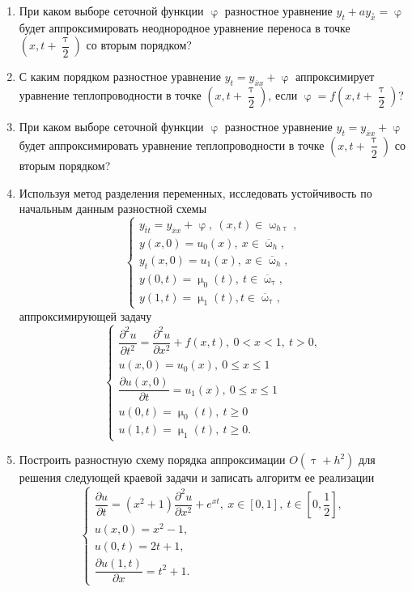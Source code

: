 \documentclass[a4paper, 12pt]{report}
\numberwithin{equation}{section}
\newcommand{\ol}{\overline}
\renewcommand{\leq}{\leqslant}
\renewcommand{\geq}{\geqslant}
\renewcommand{\varphi}{\upvarphi}
\renewcommand{\tau}{\uptau}
\renewcommand{\mu}{\upmu}
\renewcommand{\omega}{\upomega}
\renewcommand{\d}{\partial}
\begin{document}
\begin{enumerate}
		\item При каком выборе сеточной функции $\varphi$ разностное уравнение $y_t+a y_{\overset{\circ}x}= \varphi$ будет аппроксимировать неоднородное уравнение переноса в точке $\left(x, t+\dfrac \tau 2\right)$ со вторым порядком?
		\item С каким порядком разностное уравнение $y_t = y_{\ol x x} + \varphi$ аппроксимирует уравнение теплопроводности в точке $\left(x, t+ \dfrac \tau 2\right)$, если $\varphi = f\left(x , t + \dfrac \tau 2\right)$?
		\item При каком выборе сеточной функции $\varphi$ разностное уравнение $y_t = y_{\ol x x} + \varphi$ будет аппроксимировать уравнение теплопроводности в точке $\left(x, t+\dfrac \tau 2\right)$ со вторым порядком?
		\item Используя метод разделения переменных, исследовать устойчивость по начальным данным разностной схемы
		$$\begin{cases}
			y_{\ol t t} = y_{\ol x x} + \varphi,\ (x,t) \in \omega_{h\tau},\\
			y(x,0) = u_0(x),\ x \in \ol \omega_h,\\
			y_t(x,0) = u_1(x),\ x \in \ol \omega_h,\\
			y(0,t) = \mu_0(t),\ t \in \ol \omega_\tau,\\
			y(1,t) = \mu_1(t), t \in \ol \omega_\tau,
		\end{cases}$$
		аппроксимирующей задачу
		$$\begin{cases}
			\dfrac{\d^2 u}{\d t^2} = \dfrac{\d ^2 u}{\d x^2} + f(x,t),\ 0<x<1,\ t > 0,\\
			u(x,0) = u_0(x),\ 0 \leq x \leq 1\\
			\dfrac{\d u(x,0)}{\d t} = u_1(x),\ 0 \leq x \leq 1\\
			u(0,t) = \mu_0(t),\ t \geq 0\\
			u(1,t) = \mu_1(t),\ t \geq 0.
		\end{cases}$$
		\item Построить разностную схему порядка аппроксимации $O(\tau + h^2)$ для решения следующей краевой задачи и записать алгоритм ее реализации
		$$\begin{cases}
			\dfrac{\d u}{\d t} = (x^2 + 1) \dfrac{\d ^2 u}{\d x^2} + e^{xt},\ x \in [0,1],\ t \in \left[0, \dfrac 12\right],\\
			u(x,0) = x^2 -1,\\
			u(0,t) = 2t + 1,\\
			\dfrac{\d u(1,t)}{\d x} = t^2 + 1.
		\end{cases}$$

\end{enumerate}
\end{document}
